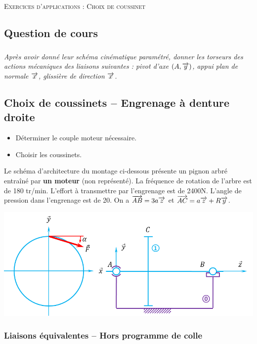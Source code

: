 \documentclass[10pt]{article}
\begin{document}

\begin{center}
\Large{\textsc{Exercices d'applications : Choix de coussinet}}
\end{center}

\vspace{.25cm}

\subsection*{Question de cours}
\subparagraph*{}
\textit{Après avoir donné leur schéma cinématique paramétré, donner les torseurs des actions mécaniques des liaisons suivantes : pivot d'axe $(A,\overrightarrow{y})$, appui plan de normale $\overrightarrow{x}$, glissière de direction $\overrightarrow{x}$.} 


\subsection*{Choix de coussinets -- Engrenage à denture droite}

\begin{obj}
\begin{itemize}
\item Déterminer le couple moteur nécessaire.
\item Choisir les coussinets.
\end{itemize}
\end{obj}


Le schéma d'architecture du montage ci-dessous présente un pignon arbré entraîné par \textbf{un moteur} (non représenté). La fréquence de rotation de l'arbre est de 180 tr/min.
L'effort à transmettre par l'engrenage est de 2400N. L'angle de pression dans l'engrenage est de 20\textdegree. On a $\overrightarrow{AB} = 3a \overrightarrow{z}$ et $\overrightarrow{AC} = a\overrightarrow{z}  + R \overrightarrow{y}$.

\begin{center}
\includegraphics[width=.7\textwidth]{images/modele}
\end{center}

\subsubsection*{Liaisons équivalentes -- Hors programme de colle}
\end{document}
